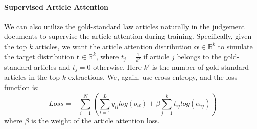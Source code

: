 \paragraph{Supervised Article Attention}
We can also utilize the gold-standard law articles naturally in the judgement documents
to supervise the article attention during training. Specifically, given the top $k$ articles, we want the article attention distribution $\bm{\alpha}\in\mathbb{R}^k$ to simulate the target distribution $\mathbf{t}\in\mathbb{R}^k$, where $t_j=\frac{1}{k'}$ if article $j$ belongs to the gold-standard articles and $t_j=0$ otherwise. Here $k'$ is the number of gold-standard articles in the top $k$ extractions.
%
%
We, again, use cross entropy, and the loss function is:
\begin{equation}
\label{final_loss}
Loss = -\sum_{i=1}^N(\sum_{l=1}^L{y_{il} log(o_{il})} + \beta \sum_{j=1}^k{t_{ij} log(\alpha_{ij})})
\end{equation}
where $\beta$ is the weight of the article attention loss.




